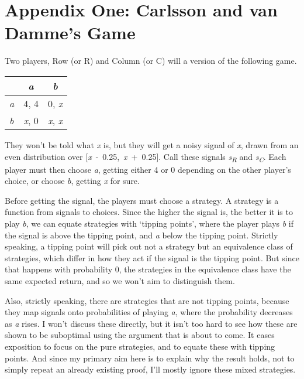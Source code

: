 \documentclass[
  10pt,
  letterpaper,
  DIV=11,
  numbers=noendperiod,
  twoside]{scrartcl}
\begin{document}
\section*{Appendix One: Carlsson and van Damme's
Game}\label{appendixone:carlssonandvandammesgame}

Two players, Row (or R) and Column (or C) will a version of the
following game.

\begin{longtable}[]{@{}lcc@{}}
\toprule\noalign{}
& \emph{a} & \emph{b} \\
\midrule\noalign{}
\endhead
\bottomrule\noalign{}
\endlastfoot
\emph{a} & 4, 4 & 0, \emph{x} \\
\emph{b} & \emph{x}, 0 & \emph{x}, \emph{x} \\
\end{longtable}

They won't be told what \emph{x} is, but they will get a noisy signal of
\emph{x}, drawn from an even distribution over
{[}\emph{x}~-~0.25,~\emph{x}~+~0.25{]}. Call these signals
\emph{s\textsubscript{R}} and \emph{s\textsubscript{C}}. Each player
must then choose \emph{a}, getting either 4 or 0 depending on the other
player's choice, or choose \emph{b}, getting \emph{x} for sure.

Before getting the signal, the players must choose a strategy. A
strategy is a function from signals to choices. Since the higher the
signal is, the better it is to play \emph{b}, we can equate strategies
with `tipping points', where the player plays \emph{b} if the signal is
above the tipping point, and \emph{a} below the tipping point. Strictly
speaking, a tipping point will pick out not a strategy but an
equivalence class of strategies, which differ in how they act if the
signal is the tipping point. But since that happens with probability 0,
the strategies in the equivalence class have the same expected return,
and so we won't aim to distinguish them.

Also, strictly speaking, there are strategies that are not tipping
points, because they map signals onto probabilities of playing \emph{a},
where the probability decreases as \emph{a} rises. I won't discuss these
directly, but it isn't too hard to see how these are shown to be
suboptimal using the argument that is about to come. It eases exposition
to focus on the pure strategies, and to equate these with tipping
points. And since my primary aim here is to explain why the result
holds, not to simply repeat an already existing proof, I'll mostly
ignore these mixed strategies.
\end{document}
